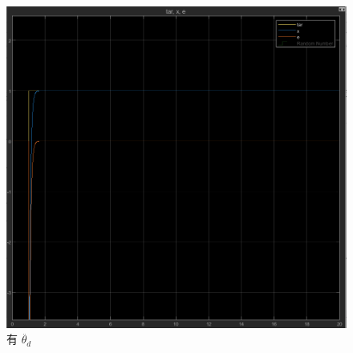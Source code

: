 \documentclass[12pt]{article}
\begin{document}
\begin{figure}[htbp]
\begin{minipage}[t]{0.48\textwidth}
                \includegraphics[width=\textwidth]{../other/Yaw_12.png}
                \caption{有 $\ddot{\theta_d}$}
                \end{minipage}
        \end{figure}
    \newpage
\end{document}
